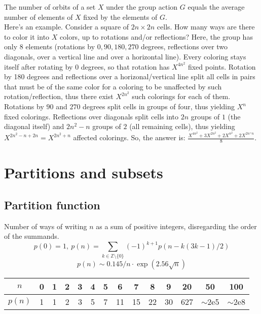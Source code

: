      The number of orbits of a set $X$ under the group action $G$ equals the average number of elements of $X$ fixed by the elements of $G$.\\
     Here’s an example. Consider a square of $2n \times 2n$ cells. How many ways are there to color it into $X$ colors, up to rotations and/or reflections?
     Here, the group has only $8$ elements (rotations by $0, 90, 180, 270$ degrees, reflections over two diagonals, over a vertical line and over a horizontal line).
     Every coloring stays itself after rotating by $0$ degrees, so that rotation has $X^{4n^2}$ fixed points.
     Rotation by 180 degrees and reflections over a horizonal/vertical line split all cells in pairs that must be of the same color
     for a coloring to be unaffected by such rotation/reflection, thus there exist $X^{2n^2}$ such colorings for each of them.
     Rotations by $90$ and $270$ degrees split cells in groups of four, thus yielding $X^n$ fixed colorings.
     Reflections over diagonals split cells into $2n$ groups of $1$ (the diagonal itself) and $2n^2-n$  groups of $2$ (all remaining cells),
     thus yielding $X^{2n^2-n+2n} = X^{2n^2+n}$ affected colorings. So, the answer is: $\frac{X^{4n^2} + 3X^{2n^2} + 2X^{n^2} + 2X^{2n^+n}}{8}$.

\section{Partitions and subsets}
	\subsection{Partition function}
		Number of ways of writing $n$ as a sum of positive integers, disregarding the order of the summands.
		\[ p(0) = 1,\ p(n) = \sum_{k \in \mathbb Z \setminus \{0\}}{(-1)^{k+1} p(n - k(3k-1) / 2)} \]
		\[ p(n) \sim 0.145 / n \cdot \exp(2.56 \sqrt{n}) \]

		\begin{center}
		\begin{tabular}{c|c@{\ }c@{\ }c@{\ }c@{\ }c@{\ }c@{\ }c@{\ }c@{\ }c@{\ }c@{\ }c@{\ }c@{\ }c}
			$n$    & 0 & 1 & 2 & 3 & 4 & 5 & 6  & 7  & 8  & 9  & 20  & 50  & 100 \\ \hline
			$p(n)$ & 1 & 1 & 2 & 3 & 5 & 7 & 11 & 15 & 22 & 30 & 627 & $\mathtt{\sim}$2e5 & $\mathtt{\sim}$2e8 \\
		\end{tabular}
		\end{center}

